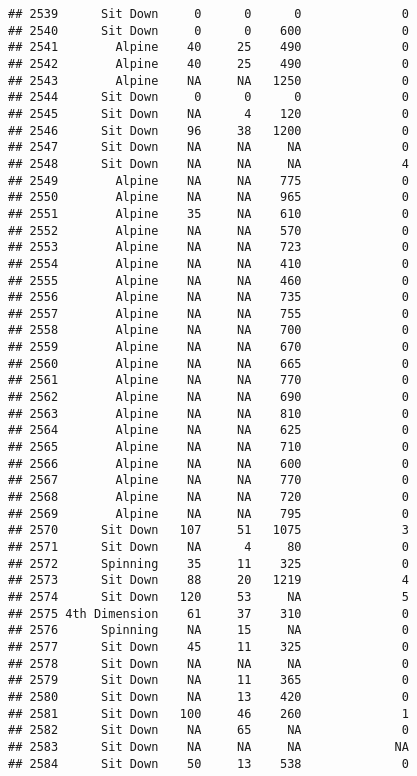 \documentclass[
]{article}
\begin{document}
\begin{verbatim}
## 2539      Sit Down     0      0      0              0
## 2540      Sit Down     0      0    600              0
## 2541        Alpine    40     25    490              0
## 2542        Alpine    40     25    490              0
## 2543        Alpine    NA     NA   1250              0
## 2544      Sit Down     0      0      0              0
## 2545      Sit Down    NA      4    120              0
## 2546      Sit Down    96     38   1200              0
## 2547      Sit Down    NA     NA     NA              0
## 2548      Sit Down    NA     NA     NA              4
## 2549        Alpine    NA     NA    775              0
## 2550        Alpine    NA     NA    965              0
## 2551        Alpine    35     NA    610              0
## 2552        Alpine    NA     NA    570              0
## 2553        Alpine    NA     NA    723              0
## 2554        Alpine    NA     NA    410              0
## 2555        Alpine    NA     NA    460              0
## 2556        Alpine    NA     NA    735              0
## 2557        Alpine    NA     NA    755              0
## 2558        Alpine    NA     NA    700              0
## 2559        Alpine    NA     NA    670              0
## 2560        Alpine    NA     NA    665              0
## 2561        Alpine    NA     NA    770              0
## 2562        Alpine    NA     NA    690              0
## 2563        Alpine    NA     NA    810              0
## 2564        Alpine    NA     NA    625              0
## 2565        Alpine    NA     NA    710              0
## 2566        Alpine    NA     NA    600              0
## 2567        Alpine    NA     NA    770              0
## 2568        Alpine    NA     NA    720              0
## 2569        Alpine    NA     NA    795              0
## 2570      Sit Down   107     51   1075              3
## 2571      Sit Down    NA      4     80              0
## 2572      Spinning    35     11    325              0
## 2573      Sit Down    88     20   1219              4
## 2574      Sit Down   120     53     NA              5
## 2575 4th Dimension    61     37    310              0
## 2576      Spinning    NA     15     NA              0
## 2577      Sit Down    45     11    325              0
## 2578      Sit Down    NA     NA     NA              0
## 2579      Sit Down    NA     11    365              0
## 2580      Sit Down    NA     13    420              0
## 2581      Sit Down   100     46    260              1
## 2582      Sit Down    NA     65     NA              0
## 2583      Sit Down    NA     NA     NA             NA
## 2584      Sit Down    50     13    538              0

\end{verbatim}
\end{document}
